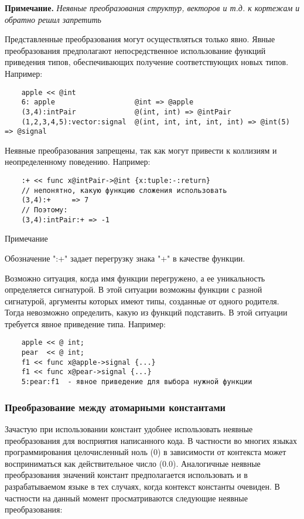 {\textbf{Примечание.}
\textit{Неявные преобразования структур, векторов и т.д. к кортежам и обратно решил запретить}

Представленные преобразования могут осуществляться только явно. Явные преобразования предполагают непосредственное использование функций приведения типов, обеспечивающих получение соответствующих новых типов. Например:

\begin{verbatim}
    apple << @int
    6: apple                   @int => @apple
    (3,4):intPair              @(int, int) => @intPair
    (1,2,3,4,5):vector:signal  @(int, int, int, int, int) => @int(5) => @signal
\end{verbatim}

Неявные преобразования запрещены, так как могут привести к коллизиям и неопределенному поведению. Например:

\begin{verbatim}
    :+ << func x@intPair->@int {x:tuple:-:return}
    // непонятно, какую функцию сложения использовать
    (3,4):+     => 7
    // Поэтому:
    (3,4):intPair:+ => -1
\end{verbatim}

Примечание

Обозначение ":+" задает перегрузку знака "+" в качестве функции.

Возможно ситуация, когда имя функции перегружено, а ее уникальность определяется сигнатурой. В этой ситуации возможны функции с разной сигнатурой, аргументы которых имеют типы, созданные от одного родителя. Тогда невозможно определить, какую из функций подставить. В этой ситуации требуется явное приведение типа. Например:

\begin{verbatim}
    apple << @ int;
    pear  << @ int;
    f1 << func x@apple->signal {...}
    f1 << func x@pear->signal {...}
    5:pear:f1  - явное приведение для выбора нужной функции
\end{verbatim}

\subsubsection{Преобразование между атомарными константами}

Зачастую при использовании констант удобнее использовать неявные преобразования для восприятия написанного кода. В частности во многих языках программирования целочисленный ноль (0) в зависимости от контекста может восприниматься как действительное число (0.0). Аналогичные неявные преобразования значений констант предполагается использовать и в разрабатываемом языке в тех случаях, когда контекст константы очевиден. В частности на данный момент просматриваются следующие неявные преобразования:

}
